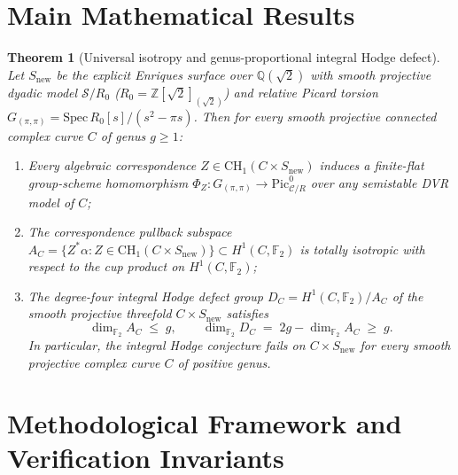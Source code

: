 \documentclass[10pt,reqno]{amsart}
\newtheorem{theorem}{Theorem}[section]
\theoremstyle{definition}
\begin{document}
\section{Main Mathematical Results}
\begin{theorem}[Universal isotropy and genus-proportional integral Hodge defect]
Let $S_{\mathrm{new}}$ be the explicit Enriques surface over $\mathbb{Q}(\sqrt{2})$ with smooth projective dyadic model $\mathcal{S}/R_0$ ($R_0=\mathbb{Z}[\sqrt{2}]_{(\sqrt{2})}$) and relative Picard torsion $G_{(\pi,\pi)} = \mathrm{Spec}\,R_0[s]/(s^2-\pi s)$. Then for \emph{every} smooth projective connected complex curve $C$ of genus $g \ge 1$:
\begin{enumerate}[label=\textup{(\arabic*)}]
  \item Every algebraic correspondence $Z \in \mathrm{CH}_1(C \times S_{\mathrm{new}})$ induces a finite-flat group-scheme homomorphism $\Phi_Z \colon G_{(\pi,\pi)} \to \mathrm{Pic}^0_{\mathcal{C}/R}$ over any semistable DVR model of $C$;
  \item The correspondence pullback subspace $A_C = \{Z^*\alpha : Z \in \mathrm{CH}_1(C \times S_{\mathrm{new}})\} \subset H^1(C,\mathbb{F}_2)$ is totally isotropic with respect to the cup product on $H^1(C,\mathbb{F}_2)$;
  \item The degree-four integral Hodge defect group $D_C = H^1(C,\mathbb{F}_2)/A_C$ of the smooth projective threefold $C \times S_{\mathrm{new}}$ satisfies
  \[
    \dim_{\mathbb{F}_2} A_C \;\le\; g, \qquad \dim_{\mathbb{F}_2} D_C \;=\; 2g - \dim_{\mathbb{F}_2} A_C \;\ge\; g.
  \]
  In particular, the integral Hodge conjecture fails on $C \times S_{\mathrm{new}}$ for \emph{every} smooth projective complex curve $C$ of positive genus.
\end{enumerate}
\end{theorem}

\section{Methodological Framework and Verification Invariants}
\end{document}
